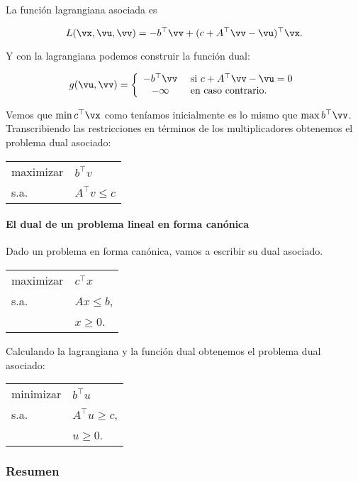 La función lagrangiana asociada es

\[
L(\vx,\vu,\vv) = -b^\top \vv + (c+A^\top \vv -\vu)^\top \vx.
\]

Y con la lagrangiana podemos construir la función dual:

\[
	g(\vu,\vv)=
		\left\{
			\begin{array}{cl} 
				-b^\top \vv & \text{ si }  c+A^\top \vv -\vu=0\\
				-\infty & \text{ en caso contrario.}
			\end{array}
		\right.
	\]


Vemos que $\min c^\top \vx$ como teníamos inicialmente es lo mismo que $\max{b^\top \vv}$.
%
Transcribiendo las restricciones en términos de los multiplicadores obtenemos el problema dual asociado:

\begin{center}
\begin{tabular}{ll}
maximizar & $b^\top v$  \\
s.a. & $A^\top v \leq c$       
\end{tabular}
\end{center}

\paragraph{El dual de un problema lineal en forma canónica}

Dado un problema en forma canónica, vamos a escribir su dual asociado.

\begin{center}
\begin{tabular}{ll}
maximizar & $c^\top x$  \\
s.a. & $Ax\leq b$,     \\
	 & $x\geq 0$.  
\end{tabular}
\end{center}

Calculando la lagrangiana y la función dual obtenemos el problema dual asociado:

\begin{center}
\begin{tabular}{ll}
minimizar & $b^\top u$  \\
s.a. & $A^\top u \geq c$,     \\
	 & $u\geq 0$.  
\end{tabular}
\end{center}



\subsubsection{Resumen}

